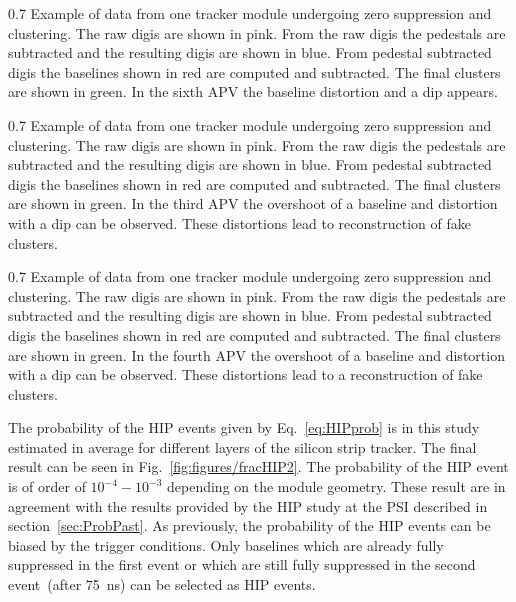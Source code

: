                  {0.7}       %
                 {Example of data from one tracker module undergoing zero suppression and clustering. The raw digis are shown in pink. From the raw digis the pedestals are subtracted and the resulting digis are shown in blue. From pedestal subtracted digis the baselines shown in red are computed and subtracted. The final clusters are shown in green. In the sixth APV the baseline distortion and a dip appears.} %


                 {0.7}       %
                 {Example of data from one tracker module undergoing zero suppression and clustering. The raw digis are shown in pink. From the raw digis the pedestals are subtracted and the resulting digis are shown in blue. From pedestal subtracted digis the baselines shown in red are computed and subtracted. The final clusters are shown in green. In the third APV the overshoot of a baseline and distortion with a dip can be observed. These distortions lead to reconstruction of fake clusters.} %


                 {0.7}       %
                 {Example of data from one tracker module undergoing zero suppression and clustering. The raw digis are shown in pink. From the raw digis the pedestals are subtracted and the resulting digis are shown in blue. From pedestal subtracted digis the baselines shown in red are computed and subtracted. The final clusters are shown in green. In the fourth APV the overshoot of a baseline and distortion with a dip can be observed. These distortions lead to a reconstruction of fake clusters.} %


The probability of the HIP events given by Eq.~\ref{eq:HIPprob} is in this study estimated in average for different layers of the silicon strip tracker. The final result can be seen in Fig.~\ref{fig:figures/fracHIP2}. The probability of the HIP event is of order of $10^{-4}-10^{-3}$ depending on the module geometry. These result are in agreement with the results provided by the HIP study at the PSI described in section~\ref{sec:ProbPast}. As previously, the probability of the HIP events can be biased by the trigger conditions. Only baselines which are already fully suppressed in the first event or which are still fully suppressed in the second event~(after 75~ns) can be selected as HIP events.

